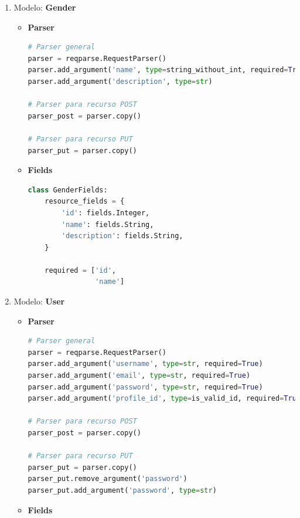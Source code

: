 \begin{enumerate}

\item Modelo: \textbf{Gender}

\begin{itemize}
	\item \textbf{Parser}
	
\begin{lstlisting}[language=Python]
# Parser general
parser = reqparse.RequestParser()
parser.add_argument('name', type=string_without_int, required=True)
parser.add_argument('description', type=str)

# Parser para recurso POST
parser_post = parser.copy()

# Parser para recurso PUT
parser_put = parser.copy()
\end{lstlisting}
	
	\item \textbf{Fields}
	
\begin{lstlisting}[language=Python]
class GenderFields:
    resource_fields = {
        'id': fields.Integer,
        'name': fields.String,
        'description': fields.String,
    }

    required = ['id',
                'name']
\end{lstlisting}	

\end{itemize}

\item Modelo: \textbf{User}

\begin{itemize}
	\item \textbf{Parser}
	
\begin{lstlisting}[language=Python]
# Parser general
parser = reqparse.RequestParser()
parser.add_argument('username', type=str, required=True)
parser.add_argument('email', type=str, required=True)
parser.add_argument('password', type=str, required=True)
parser.add_argument('profile_id', type=is_valid_id, required=True)

# Parser para recurso POST
parser_post = parser.copy()

# Parser para recurso PUT
parser_put = parser.copy()
parser_put.remove_argument('password')
parser_put.add_argument('password', type=str)
\end{lstlisting}
	
	\item \textbf{Fields}
	

\end{itemize}
\end{enumerate}
